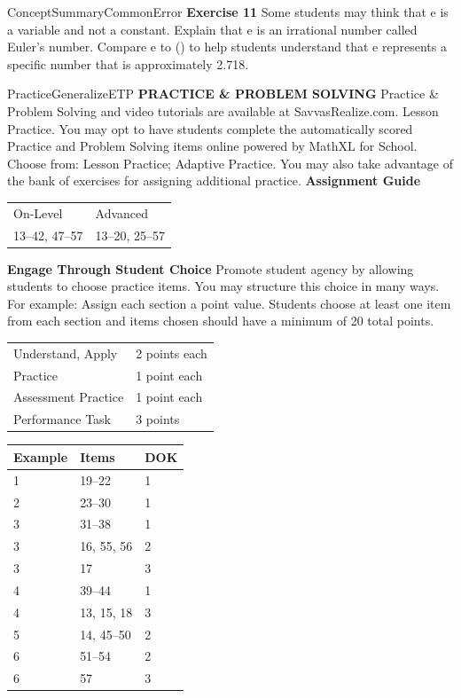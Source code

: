 \documentclass{article}
\newenvironment{item-analysis}{}{}      %
\newenvironment{te-addendum}[2]{}{}     %
\newcommand{\te}[1]{}                   %
\begin{document}
\begin{te-addendum}{ConceptSummary}{CommonError}
\textbf{Exercise 11}
Some students may think that e is a variable and not a constant. Explain that e is an irrational number called Euler's number. Compare e to (\pi) to help students understand that e represents a specific number that is approximately 2.718.
\end{te-addendum}
\begin{te-addendum}{Practice}{GeneralizeETP}
\textbf{PRACTICE \& PROBLEM SOLVING}
Practice \& Problem Solving and video tutorials are available at SavvasRealize.com.\te{Scan the QR code to access a video tutorial.}
Lesson Practice. You may opt to have students complete the automatically scored Practice and Problem Solving items online powered by MathXL for School.
Choose from: Lesson Practice; Adaptive Practice.
You may also take advantage of the bank of exercises for assigning additional practice.
\textbf{Assignment Guide}
\begin{tabular}{ll}
On-Level & Advanced \\
13--42, 47--57 & 13--20, 25--57 \\
\end{tabular}
\textbf{Engage Through Student Choice}
Promote student agency by allowing students to choose practice items. You may structure this choice in many ways.
For example: Assign each section a point value. Students choose at least one item from each section and items chosen should have a minimum of 20 total points.
\begin{tabular}{ll}
Understand, Apply & 2 points each \\
Practice & 1 point each \\
Assessment Practice & 1 point each \\
Performance Task & 3 points \\
\end{tabular}
\end{te-addendum}
\begin{item-analysis}
\begin{tabular}{lll}
\toprule
Example & Items & DOK \\
\midrule
1 & 19--22 & 1 \\
2 & 23--30 & 1 \\
3 & 31--38 & 1 \\
3 & 16, 55, 56 & 2 \\
3 & 17 & 3 \\
4 & 39--44 & 1 \\
4 & 13, 15, 18 & 3 \\
5 & 14, 45--50 & 2 \\
6 & 51--54 & 2 \\
6 & 57 & 3 \\
\bottomrule
\end{tabular}
\te{Printed Item Analysis item ranges are shifted by one from several student-page example cross-references; preserved as printed. Item 58 is omitted.}
\end{item-analysis}
\end{document}
